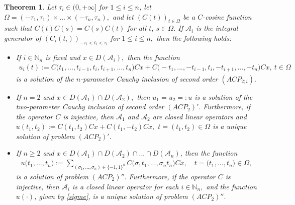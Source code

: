 \documentclass{amsart}
\newtheorem{thm}{Theorem}[section]
\theoremstyle{definition}
\theoremstyle{remark}
\numberwithin{equation}{section}
\begin{document}
\begin{thm}\label{novio} 
Let $\tau_{i}\in (0,+\infty]$ for $1\leq i \leq n$, let $\Omega =(-\tau_{1},\tau_{1}) \times ... \times (-\tau_{n},\tau_{n}),$ and let $(C(t))_{t\in \Omega}$ 
be a $C$-cosine function such that $C(t)C(s)=C(s)C(t)$ for all $t,\ s\in \Omega$. If ${\mathcal A}_{i}$ is the integral generator of 
$(C_{i}(t_{i}))_{-\tau_{i}< t_{i} <\tau_{i}}$ for $1\leq i\leq n,$ then the following holds:
\begin{itemize}
\item[(i)] If $  i\in {\mathbb N}_{n}$ is fixed and $x\in D({\mathcal A}_{i}),$ then the function 
\begin{align}\label{dfg}
u_{i}(t):=C\bigl(t_{1},...,t_{i-1},t_{i},t_{i+1},...,t_{n} \bigr)Cx+C\bigl(-t_{1},...,-t_{i-1},t_{i},-t_{i+1},...,-t_{n} \bigr)Cx,\ t\in \Omega
\end{align}
 is a solution of the $n$-parameter Cauchy inclusion of second order $(ACP_{2;i}).$
\item[(ii)] If $n=2$ and $x\in D({\mathcal A}_{1}) \cap D({\mathcal A}_{2}),$ then $u_{1}=u_{2}=:u$ is a solution of the two-parameter Cauchy inclusion of second order $(ACP_{2})'.$ 
Furthermore, if the operator $C$ is injective, then ${\mathcal A}_{1}$ and ${\mathcal A}_{2}$ are closed linear operators and $u(t_{1},t_{2}):=C(t_{1},t_{2})Cx+C(t_{1},-t_{2})Cx,$ $t=(t_{1},t_{2})\in \Omega$ is a unique solution of problem $(ACP_{2})'.$
\item[(iii)] If $n \geq 2$ and $x\in D({\mathcal A}_{1}) \cap D({\mathcal A}_{2}) \cap ... \cap D({\mathcal A}_{n})$, then the function
\begin{align}\label{sigme}
u\bigl(t_{1},...,t_{n}\bigr):=\sum_{(\sigma_{1},...,\sigma_{n}) \in \{ -1,1\}^{n}}C\bigl( \sigma_{1}t_{1},..., \sigma_{n}t_{n}\bigr)Cx,\quad t=\bigl(t_{1},...,t_{n}\bigr) \in \Omega,
\end{align}
is a solution of problem $(ACP_{2})''.$
Furthermore, if the operator $C$ is injective, then ${\mathcal A}_{i}$ is a closed linear operator for each $i\in {\mathbb N}_{n},$ and the function $u(\cdot)$, given by \eqref{sigme}, is a unique solution of problem $(ACP_{2})''.$
\end{itemize}
\end{thm}
\end{document}
